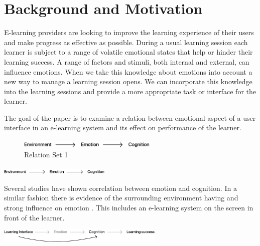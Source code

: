 

\pagebreak

\section{Background and Motivation}

E-learning providers are looking to improve the learning experience of their users and make progress as effective as possible. 
During a usual learning session each learner is subject to a range of volatile emotional states that help or hinder their learning success. 
A range of factors and stimuli, both internal and external, can influence emotions. 
When we take this knowledge about emotions into account a new way to manage a learning session opens. We can incorporate this knowledge into the learning sessions and provide a more appropriate task or interface for the learner.

The goal of the paper is to examine a relation between emotional aspect of a user interface in an e-learning system and its effect on performance of the learner.

\begin{figure}
	\begin{center}
		\includegraphics[width=250px]{images/relation1.png}
		\caption{Relation Set 1\label{fig:relation1}}
	\end{center}
\end{figure}

\begin{center}
	\includegraphics[width=200px]{images/relation1.png}
\end{center}
 
Several studies have shown correlation between emotion and cognition. In a similar fashion there is evidence of the surrounding environment having and strong influence on emotion \cite{Johnson2000, Arockiam2013, Bertamini2013}. This includes an e-learning system on the screen in front of the learner.

\begin{center}
\includegraphics[width=300px]{images/relation2.png}
\end{center}

